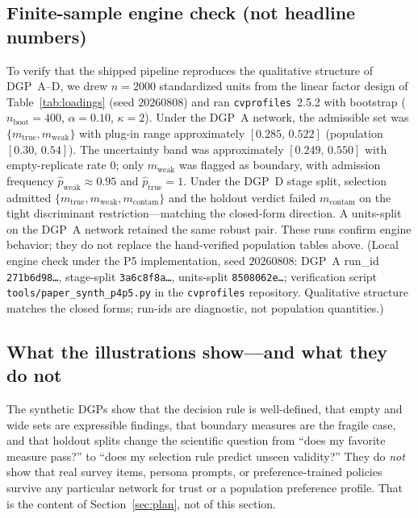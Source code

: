 \documentclass[10pt,letterpaper]{article}
\newcommand{\cvp}{\texttt{cvprofiles}}
\begin{document}
\subsection{Finite-sample engine check (not headline numbers)}
To verify that the shipped pipeline reproduces the qualitative structure of DGP~A--D, we drew $n{=}2000$ standardized units from the linear factor design of Table~\ref{tab:loadings} (seed $20260808$) and ran \cvp{}~2.5.2 with bootstrap ($n_{\mathrm{boot}}{=}400$, $\alpha{=}0.10$, $\kappa{=}2$).
Under the DGP~A network, the admissible set was $\{m_{\mathrm{true}},m_{\mathrm{weak}}\}$ with plug-in range approximately $[0.285,\,0.522]$ (population $[0.30,\,0.54]$).
The uncertainty band was approximately $[0.249,\,0.550]$ with empty-replicate rate $0$; only $m_{\mathrm{weak}}$ was flagged as boundary, with admission frequency $\hat p_{\mathrm{weak}}\approx 0.95$ and $\hat p_{\mathrm{true}}=1$.
Under the DGP~D stage split, selection admitted $\{m_{\mathrm{true}},m_{\mathrm{weak}},m_{\mathrm{contam}}\}$ and the holdout verdict failed $m_{\mathrm{contam}}$ on the tight discriminant restriction---matching the closed-form direction.
A units-split on the DGP~A network retained the same robust pair.
These runs confirm engine behavior; they do not replace the hand-verified population tables above.
(Local engine check under the P5 implementation, seed $20260808$: DGP~A run\_id \texttt{271b6d98\ldots}, stage-split \texttt{3a6c8f8a\ldots}, units-split \texttt{8508062e\ldots}; verification script \texttt{tools/paper\_synth\_p4p5.py} in the \cvp{} repository. Qualitative structure matches the closed forms; run-ids are diagnostic, not population quantities.)

\subsection{What the illustrations show---and what they do not}
The synthetic DGPs show that the decision rule is well-defined, that empty and wide sets are expressible findings, that boundary measures are the fragile case, and that holdout splits change the scientific question from ``does my favorite measure pass?'' to ``does my selection rule predict unseen validity?''
They do \emph{not} show that real survey items, persona prompts, or preference-trained policies survive any particular network for trust or a population preference profile.
That is the content of Section~\ref{sec:plan}, not of this section.

\end{document}
